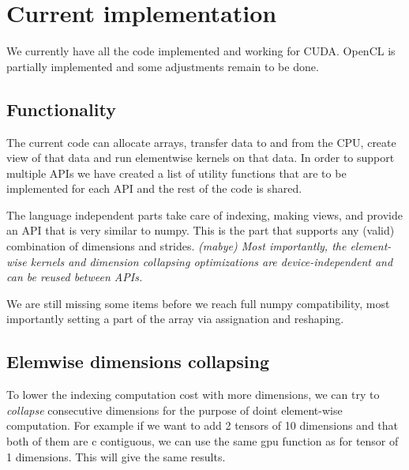 \documentclass{article} %
\begin{document}
\section{Current implementation}

We currently have all the code implemented and working for CUDA.  
OpenCL is partially implemented and some adjustments remain to be done.  

\subsection{Functionality}

The current code can allocate arrays, transfer data to and from the CPU, create view of that data and run elementwise kernels on that data.  In order to support multiple APIs we have created a list of utility functions that are to be implemented for each API and the rest of the code is shared.

The language independent parts take care of indexing, making views, and provide an API that is very similar to numpy.  This is the part that supports any (valid) combination of dimensions and strides.  \emph{(mabye) Most importantly, the element-wise kernels and dimension collapsing optimizations are device-independent and can be reused between APIs.}

We are still missing some items before we reach full numpy compatibility, most importantly setting a part of the array via assignation and reshaping.

\subsection{Elemwise dimensions collapsing}
To lower the indexing computation cost with more dimensions, we can
try to \emph{collapse} consecutive dimensions for the purpose of doint
element-wise computation. For example if we want to add 2 tensors of
10 dimensions and that both of them are c contiguous, we can use the
same gpu function as for tensor of 1 dimensions. This will give the
same results.
\end{document}

